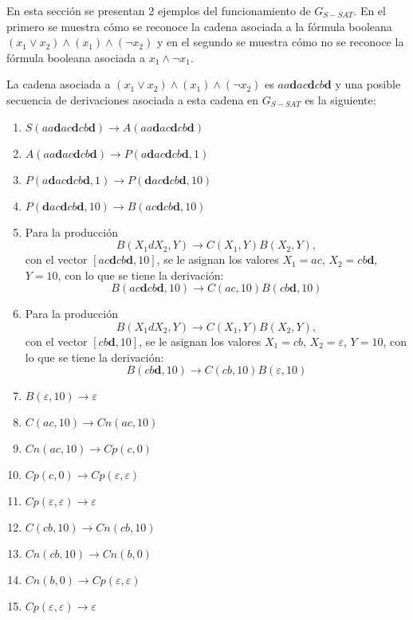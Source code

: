 \documentclass[12pt]{article}
\begin{document}
En esta sección se presentan 2 ejemplos del funcionamiento de $G_{S-SAT}$. En el primero se muestra cómo se reconoce la cadena asociada a la fórmula booleana $(x_1 \vee x_2) \wedge (x_1) \wedge (\neg x_2)$ y en el segundo se muestra cómo no se reconoce la fórmula booleana asociada a $x_1 \wedge \neg x_1$.

La cadena asociada a $(x_1 \vee x_2) \wedge (x_1) \wedge (\neg x_2)$ es $aa\mathbf{d}ac\mathbf{d}cb\mathbf{d}$ y una posible secuencia de derivaciones
asociada a esta cadena en $G_{S-SAT}$ es la siguiente:

\begin{enumerate}
    \item $S(aa\mathbf{d}ac\mathbf{d}cb\mathbf{d})\to A(aa\mathbf{d}ac\mathbf{d}cb\mathbf{d})$
    \item $A(aa\mathbf{d}ac\mathbf{d}cb\mathbf{d})\to P(a\mathbf{d}ac\mathbf{d}cb\mathbf{d},1)$
    \item $P(a\mathbf{d}ac\mathbf{d}cb\mathbf{d},1)\to P(\mathbf{d}ac\mathbf{d}cb\mathbf{d},10)$
    \item $P(\mathbf{d}ac\mathbf{d}cb\mathbf{d},10)\to B(ac\mathbf{d}cb\mathbf{d}, 10)$
    \item Para la producción $$B(X_1dX_2,Y)\to C(X_1,Y) B(X_2,Y),$$ con el vector $[ac\mathbf{d}cb\mathbf{d}, 10]$,
          se le asignan los valores $X_1=ac$, $X_2=cb\mathbf{d}$, $Y=10$, con lo que se tiene la derivación:
          $$B(ac\mathbf{d}cb\mathbf{d}, 10)\to C(ac,10) B(cb\mathbf{d},10)$$
    \item Para la producción $$B(X_1dX_2,Y)\to C(X_1,Y) B(X_2,Y),$$ con el vector $[cb\mathbf{d},10]$,
          se le asignan los valores $X_1=cb$, $X_2=\varepsilon$, $Y=10$, con lo que se tiene la derivación:
          $$B(cb\mathbf{d},10)\to C(cb,10) B(\varepsilon,10)$$
    \item $B(\varepsilon,10)\to \varepsilon$
    \item $C(ac,10)\to Cn(ac,10)$
    \item $Cn(ac,10)\to Cp(c,0)$
    \item $Cp(c,0)\to Cp(\varepsilon,\varepsilon)$
    \item $Cp(\varepsilon, \varepsilon) \to \varepsilon$
    \item $C(cb,10)\to Cn(cb,10)$
    \item $Cn(cb,10)\to Cn(b,0)$
    \item $Cn(b,0)\to Cp(\varepsilon,\varepsilon)$
    \item $Cp(\varepsilon, \varepsilon) \to \varepsilon$
\end{enumerate}
\end{document}
